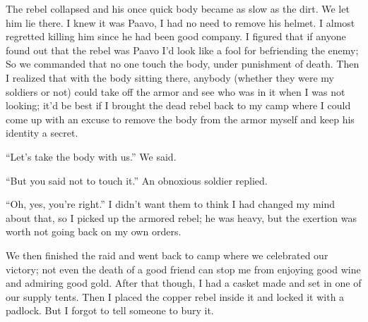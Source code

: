 The rebel collapsed and his once quick body became as slow as the dirt. We let him lie there. I knew it was Paa\-vo, I had no need to remove his helmet. I almost regretted killing him since he had been good company.
I figured that if anyone found out that the rebel was Paa\-vo I'd look like a fool for befriending the enemy;
So we commanded that no one touch the body, under punishment of death. Then I realized that with the body sitting there, anybody (whether they were my soldiers or not) could take off the armor and see who was in it when I was not looking; it'd be best if I brought the dead rebel back to my camp where I could come up with an excuse to remove the body from the armor myself and keep his identity a secret.

``Let's take the body with us.'' We said.

``But you said not to touch it.'' An obnoxious soldier replied.

``Oh, yes, you're right.'' I didn't want them to think I had changed my mind about that, so I picked up the armored rebel; he was heavy, but the exertion was worth not going back on my own orders.

We then finished the raid and went back to camp where we celebrated our victory; not even the death of a good friend can stop me from enjoying good wine and admiring good gold. After that though, I had a casket made and set in one of our supply tents. Then I placed the copper rebel inside it and locked it with a padlock. But I forgot to tell someone to bury it.
